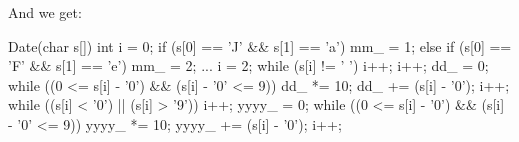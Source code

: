 And we get:

\begin{consolethree}[escapeinside=||]
Date(char s[])
{
    int i = 0;
    if (s[0] == 'J' && s[1] == 'a') mm_ = 1;
    else if (s[0] == 'F' && s[1] == 'e') mm_ = 2;
    ...
    i = 2;
    while (s[i] != ' ') i++;
    i++;
    dd_ = 0;
    while ((0 <= s[i] - '0') && (s[i] - '0' <= 9))
    {
        dd_ *= 10; dd_ += (s[i] - '0'); i++;
    }
    while ((s[i] < '0') || (s[i] > '9')) i++;
    yyyy_ = 0;
    while ((0 <= s[i] - '0') && (s[i] - '0' <= 9))
    {
        yyyy_ *= 10;
        yyyy_ += (s[i] - '0');
        i++;
    }
}
\end{consolethree}


